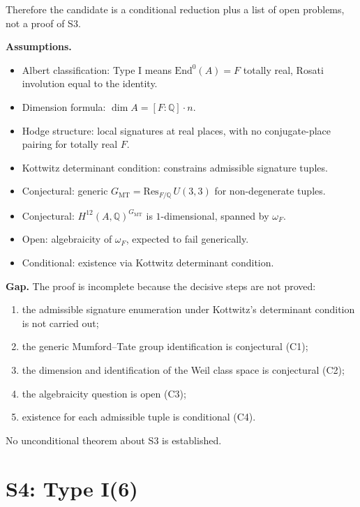 \documentclass{article}
\begin{document}
Therefore the candidate is a conditional reduction plus a list of open problems, not a proof of S3.

\medskip

\noindent\textbf{Assumptions.}
\begin{itemize}
  \item[(K1)] Albert classification: Type I means $\mathrm{End}^0(A)=F$ totally real, Rosati involution equal to the identity.
  \item[(K2)] Dimension formula: $\dim A=[F:\mathbb{Q}]\cdot n$.
  \item[(K3)] Hodge structure: local signatures at real places, with no conjugate-place pairing for totally real $F$.
  \item[(K4)] Kottwitz determinant condition: constrains admissible signature tuples.
  \item[(C1)] Conjectural: generic $G_{\mathrm{MT}}=\mathrm{Res}_{F/\mathbb{Q}}\, U(3,3)$ for non-degenerate tuples.
  \item[(C2)] Conjectural: $H^{12}(A,\mathbb{Q})^{G_{\mathrm{MT}}}$ is $1$-dimensional, spanned by $\omega_F$.
  \item[(C3)] Open: algebraicity of $\omega_F$, expected to fail generically.
  \item[(C4)] Conditional: existence via Kottwitz determinant condition.
\end{itemize}

\medskip

\noindent\textbf{Gap.} The proof is incomplete because the decisive steps are not proved:
\begin{enumerate}
  \item the admissible signature enumeration under Kottwitz's determinant condition is not carried out;
  \item the generic Mumford--Tate group identification is conjectural (C1);
  \item the dimension and identification of the Weil class space is conjectural (C2);
  \item the algebraicity question is open (C3);
  \item existence for each admissible tuple is conditional (C4).
\end{enumerate}
No unconditional theorem about S3 is established.

\section{S4: Type I(6)}
\end{document}
